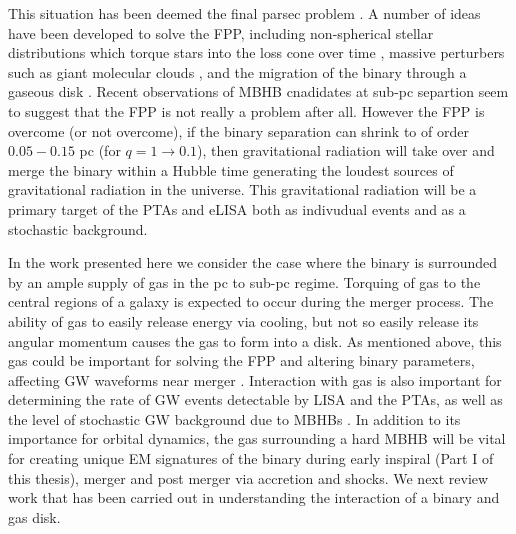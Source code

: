 This situation has been deemed the final parsec problem
\citep[FPP][]{MilosPhinney:2001}. A number of ideas have been developed to
solve the FPP, including non-spherical stellar distributions which torque
stars into the loss cone over time \citep{triaxialFPPsolns}, massive
perturbers such as giant molecular clouds \citep{massivpertFPPsolns}, and the
migration of the binary through a gaseous disk \citep{GoldRix:2000,
ArmNat:2002:ApJL}. Recent observations of MBHB cnadidates at sub-pc separtion
seem to suggest that the FPP is not really a problem after all. However the
FPP is overcome (or not overcome), if the binary separation can shrink to of
order $0.05-0.15$ pc (for $q=1 \rightarrow 0.1$), then gravitational radiation
will take over and merge the binary within a Hubble time \citep{Peters:1964}
generating the loudest sources of gravitational radiation in the universe.
This gravitational radiation will be a primary target of the PTAs and eLISA
both as indivudual events and as a stochastic background.

In the work presented here we consider the case where the binary is surrounded
by an ample supply of gas in the pc to sub-pc regime. Torquing of gas to the
central regions of a galaxy is expected to occur during the merger
process\citep{BarnesHernquist:1996, Barnes:2002}. The ability of gas to easily
release energy via cooling, but not so easily release its angular momentum
causes the gas to form into a disk. As mentioned above, this gas could be
important for solving the FPP and altering binary parameters, affecting GW
waveforms near merger \citep[\emph{e.g.}][]{ArmNat:2005, YKH:2011:L,
RoedigSesana:2012, Sesana:2016}. Interaction with gas is also important for
determining the rate of GW events detectable by LISA and the PTAs, as well as
the level of stochastic GW background due to MBHBs \citep{SesanaKocsis:,
Shannon:2015, PTAsGWB}. In addition to its importance for orbital dynamics,
the gas surrounding a hard MBHB will be vital for creating unique EM
signatures of the binary during early inspiral (Part I of this thesis), merger
\citep{Chang:2010, Baruteau:2012, CerioliLodato:Squeeze:2016} and post merger
\citep{Lippai:2008, Lia10, Ponce:2012, } via accretion and shocks. We next
review work that has been carried out in understanding the interaction of a
binary and gas disk.


	
